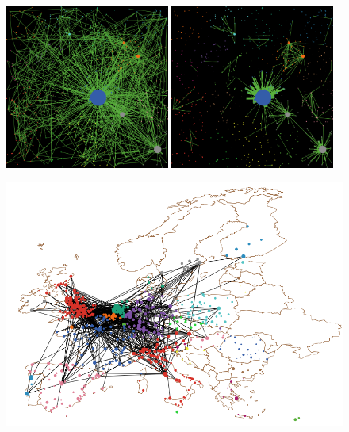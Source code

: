 \documentclass[11pt]{article}
\begin{document}
\begin{figure}
    \includegraphics[width=0.48\textwidth]{figures/ex_alleq-highgravity_seed-12102_t1500.png}
    \includegraphics[width=0.48\textwidth]{figures/ex_alleq-lowgravity_seed-12102_t1500.png}\\
    \begin{minipage}{0.48\textwidth}
    \begin{mdframed}
    \includegraphics[width=\textwidth]{figures/ex_real_highgravity_t1500.png}

\end{mdframed}
\end{minipage}
\end{figure}
\end{document}
